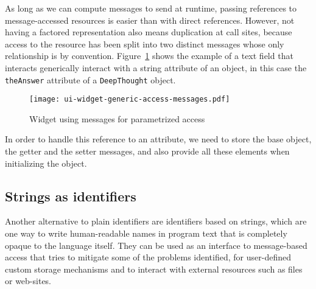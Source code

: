 \documentclass[preprint,authoryear]{llncs}
\begin{document}
As long as we can compute messages to send at runtime,
passing references to message-accessed resources is easier than with
direct references.  However, not having a factored representation also means
duplication at call sites, because 
access to the resource has been split into two distinct messages whose only relationship is by 
convention.   Figure~\ref{ui-widget-msg-access} shows the example of a text field
that interacts generically interact with a string attribute of an object, in 
this case the {\tt theAnswer} attribute of a {\tt DeepThought} object.

\begin{figure}[htbp]
\begin{center}
\texttt{[image: ui-widget-generic-access-messages.pdf]}
\caption{Widget using messages for parametrized access}
\label{ui-widget-msg-access}
\end{center}
\end{figure}

In order to handle this reference to an attribute, we need to store the base object,
the getter and the setter messages, and also provide all these elements when
initializing the object.



\subsection{Strings as identifiers}


Another alternative to plain identifiers are identifiers based on strings, which are one 
way to write human-readable names in program text that is completely opaque to the language itself.
They can be used as an interface to message-based access that tries to mitigate some of the problems
identified, for user-defined custom storage
mechanisms and to interact with external resources such as files or web-sites.
\end{document}
